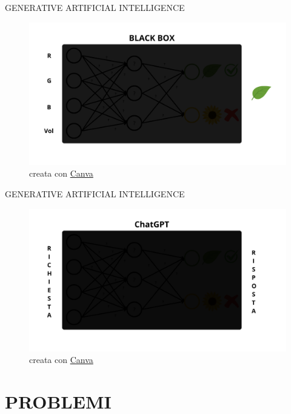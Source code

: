 \documentclass[aspectratio=1610]{beamer}
\begin{document}
\begin{frame}{GENERATIVE ARTIFICIAL INTELLIGENCE}
    \begin{figure}
        \includegraphics[width=\linewidth]{img/reteNeurale11.png}
        \caption{{creata con \href{www.canva.com}{Canva}}}
    \end{figure}
\end{frame}

\begin{frame}{GENERATIVE ARTIFICIAL INTELLIGENCE}
    \begin{figure}
        \includegraphics[width=\linewidth]{img/reteNeurale12.png}
        \caption{{creata con \href{www.canva.com}{Canva}}}
    \end{figure}
\end{frame}

\section{PROBLEMI}
\end{document}
